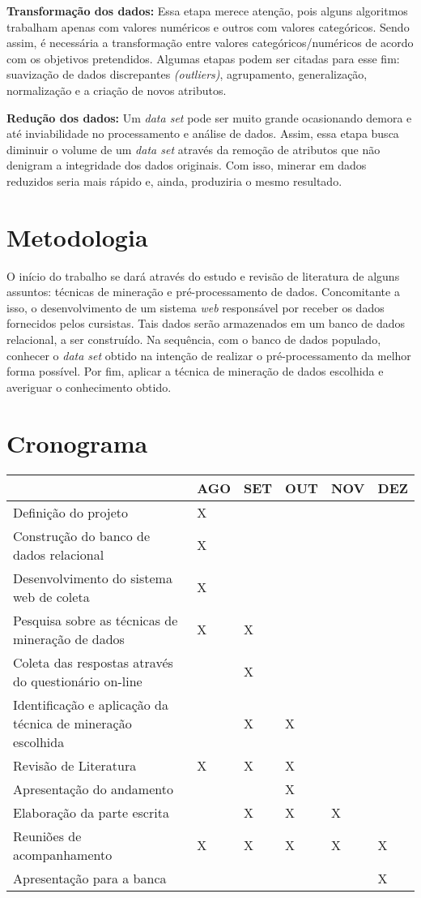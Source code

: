 \documentclass[projtg]{mdtufsm}
\begin{document}
\textbf{Transformação dos dados:} Essa etapa merece atenção, pois alguns algoritmos trabalham apenas com valores numéricos e outros com valores categóricos. Sendo assim, é necessária a transformação entre valores categóricos/numéricos de acordo com os objetivos pretendidos. Algumas etapas podem ser citadas para esse fim: suavização de dados discrepantes \textit{(outliers)}, agrupamento, generalização, normalização e a criação de novos atributos.

\textbf{Redução dos dados:} Um \textit{data set} pode ser muito grande ocasionando demora e até inviabilidade no processamento e análise de dados. Assim, essa etapa busca diminuir o volume de um \textit{data set} através da remoção de atributos que não denigram a integridade dos dados originais. Com isso, minerar em dados reduzidos seria mais rápido e, ainda, produziria o mesmo resultado. 




\chapter{Metodologia}
O início do trabalho se dará através do estudo e revisão de literatura de alguns assuntos: técnicas de mineração e pré-processamento de dados. Concomitante a isso, o desenvolvimento de um sistema {\it web} responsável por receber os dados fornecidos pelos cursistas. Tais dados serão armazenados em um banco de dados relacional, a ser construído. Na sequência, com o banco de dados populado, conhecer o \textit{data set} obtido na intenção de realizar o pré-processamento da melhor forma possível. Por fim, aplicar a técnica de mineração de dados escolhida e averiguar o conhecimento obtido. 
    
\chapter{Cronograma}
\begin{tabu} to 0.9\linewidth{|X[6]|X|X|X|X|X|}
	\hline
	& AGO & SET & OUT & NOV & DEZ \\
	\hline
	Definição do projeto & X & & & & \\
	\hline
	Construção do banco de dados relacional & X & & & & \\
	\hline
	Desenvolvimento do sistema web de coleta & X & & & & \\
	\hline
	Pesquisa sobre as técnicas de mineração de dados & X & X & & & \\
	\hline
	Coleta das respostas através do questionário on-line & & X & & & \\
	\hline
	Identificação e aplicação da técnica de mineração escolhida & & X & X & & \\
	\hline
	Revisão de Literatura & X & X & X & & \\
	\hline
	Apresentação do andamento & & & X & & \\
	\hline
	Elaboração da parte escrita & & X & X & X & \\
	\hline
	Reuniões de acompanhamento & X & X & X & X & X \\
	\hline
	Apresentação para a banca & & & & & X \\
	\hline
\end{tabu}
 
\setlength{\baselineskip}{\baselineskip}



\end{document}

